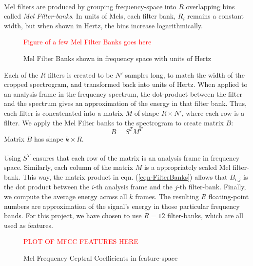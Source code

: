 \documentclass[12pt,letterpaper]{article}
\begin{document}
\paragraph*{}Mel filters are produced by grouping frequency-space into $R$ overlapping bins called \textit{Mel Filter-banks}. In units of Mels, each filter bank, $R_i$ remains a constant width, but when shown in Hertz, the bins increase logarithmically. 
\begin{figure}[H]
\label{fig-MelFilterBanks}
\begin{center}
\textcolor{red}{Figure of a few Mel Filter Banks goes here}
\end{center}
\caption{Mel Filter Banks shown in frequency space with units of Hertz}
\end{figure}
Each of the $R$ filters is created to be $N'$ samples long, to match the width of the cropped spectrogram, and transformed back into units of Hertz. When applied to an analysis frame in the frequency spectrum, the dot-product between the filter and the spectrum gives an approximation of the energy in that filter bank. Thus, each filter is concatenated into a matrix $M$ of shape $R \times N'$, where each row is a filter. We apply the Mel Filter banks to the spectrogram to create matrix $B$:
\begin{equation}
\label{eqn-FilterBanks}
B = S^T M^T
\end{equation}
Matrix $B$ has shape $k \times R$.

\paragraph*{}Using $S^T$ ensures that each row of the matrix is an analysis frame in frequency space. Similarly, each column of the matrix $M$ is a appropriately scaled Mel filter-bank. This way, the matrix product in eqn. (\ref{eqn-FilterBanks}) allows that $B_{i,j}$ is the dot product between the $i$-th analysis frame and the $j$-th filter-bank. Finally, we compute the average energy across all $k$ frames. The resulting $R$ floating-point numbers are approximation of the signal's energy in those particular frequency bands. For this project, we have chosen to use $R = 12$ filter-banks, which are all used as features.

\begin{figure}[H]
\begin{center}
\textcolor{red}{PLOT OF MFCC FEATURES HERE}
\end{center}
\caption{Mel Frequency Ceptral Coefficients in feature-space}
\label{fig-FeatureMFCC}
\end{figure}
\end{document}
